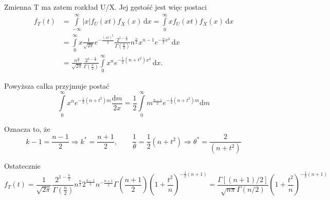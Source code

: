 \documentclass{article}
\begin{document}
Zmienna T ma zatem rozkład U/X. Jej gęstość jest więc postaci 
\begin{displaymath}
{\begin{aligned}f_{T}(t)&=\int \limits _{-\infty }^{\infty }|x|f_{U}(xt)f_{X}(x)\,\mathrm {d} x=\int \limits _{0}^{\infty }xf_{U}(xt)f_{X}(x)\,\mathrm {d} x\\&=\int \limits _{0}^{\infty }x{\frac {1}{\sqrt {2\pi }}}e^{-{\frac {(xt)^{2}}{2}}}{\frac {2^{1-{\frac {n}{2}}}}{\Gamma \left({\frac {n}{2}}\right)}}n^{\frac {n}{2}}x^{n-1}e^{-{\frac {n}{2}}x^{2}}\,\mathrm {d} x\\&={\frac {n^{\frac {n}{2}}}{\sqrt {2\pi }}}{\frac {2^{1-{\frac {n}{2}}}}{\Gamma \left({\frac {n}{2}}\right)}}\int \limits _{0}^{\infty }x^{n}e^{-{\frac {1}{2}}(n+t^{2})x^{2}}\,\mathrm {d} x.\end{aligned}}
\end{displaymath}

Powyższa całka przyjmuje postać
\begin{equation*}
\int \limits _{0}^{\infty }x^{n}e^{-{\frac {1}{2}}(n+t^{2})m}{\frac {\mathrm {d} m}{2x}}={\frac {1}{2}}\int \limits _{0}^{\infty }m^{\frac {n-1}{2}}e^{-{\frac {1}{2}}(n+t^{2})m}\mathrm {d} m
\end{equation*}

Oznacza to, że
$$ k-1={\frac {n-1}{2}}\Rightarrow k^{*}={\frac {n+1}{2}},\qquad {\frac {1}{\theta }}={\frac {1}{2}}(n+t^{2})\Rightarrow \theta ^{*}={\frac {2}{(n+t^{2})}} $$

Ostatecznie
$$ f_{T}(t)={\frac {1}{\sqrt {2\pi }}}{\frac {2^{1-{\frac {n}{2}}}}{\Gamma \left({\frac {n}{2}}\right)}}n^{\frac {n}{2}}2^{\frac {n-1}{2}}n^{-{\frac {n+1}{2}}}\Gamma \left({\frac {n+1}{2}}\right)\left(1+{\frac {t^{2}}{n}}\right)^{-{\frac {1}{2}}(n+1)}={\frac {\Gamma [(n+1)/2]}{{\sqrt {n\pi }}\Gamma (n/2)}}\left(1+{\frac {t^{2}}{n}}\right)^{-{\frac {1}{2}}(n+1)} $$
\end{document}
